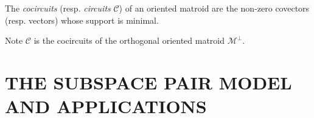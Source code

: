 \documentclass{article}
\def\Reals{\ensuremath{\mathbf R}}
\newtheorem{theorem}{Theorem}
\newcommand{\extra}[1]{}
\begin{document}
The \textit{cocircuits} (resp. \textit{circuits} $\mathcal{C}$)
of an oriented matroid are the non-zero covectors (resp. vectors)
whose support is minimal.  
\extra{Minty's painting property,
most popularly known as a theorem about 
directed graphs\cite{VandewalleChua}, is generally true about
the cocircuit $\mathcal{C}^*(\mathcal{M})$ and circuit 
$\mathcal{C}(\mathcal{M})$ collections.}
Note $\mathcal{C}$ is the
cocircuits of the orthogonal oriented matroid $\mathcal{M}^\perp$.
\extra{In fact, when the 
simple non-triviality, symmetry, and minimal support properties are assumed, 
the painting property characterizes when 
$\mathcal{C}^*$ and $\mathcal{C}$ are the cocircuit/circuit collections of 
an oriented matroid.}

\extra{
\begin{theorem}
(\cite{OMBOOK}, Th. 3.4.4(4P); \cite{BachemKern}, Prop. 5.12) 
For every partition $U=R\cup G \cup B \cup W$ and for every $e\in R\cup G$,
\textbf{either} %
(a) There exists $X\in\mathcal{C}^*$ so $e\in\mbox{Supp}{X}$,
$X_R\geq 0$, $X_G\leq 0$, $X_B$ unrestricted and $X_W=0$ %
\textbf{or}\\
(b) There exists $Y\in\mathcal{C}$ so $e\in\mbox{Supp}{Y}$,
$Y_R\geq 0$, $Y_G\leq 0$, $Y_B = 0$ and $Y_W$ unrestricted %
\textbf{but not both.}
\end{theorem}
}

\section{THE SUBSPACE PAIR MODEL AND APPLICATIONS}

\begin{comment}
A \textit{subspace pair} $(L_V, L_I)$ is a pair of linear subspaces of
$\Reals^U$, where the elements of finite set $U$ index the coordinates.
The scalar product $v\cdot w = \sum_{e\in U}v_e w_e$ is used to define that
$v, w \in \Reals^U$ are \textit{orthogonal} when $v\cdot w = 0$.  An 
\textit{orthogonal subspace pair}  satisfies $v\cdot w = 0$ for
all $v\in L_V$ and $w\in L_I$.  A subspace pair has \textit{full rank} when
$\mathrm{rank}(L_V)+\mathrm{rank}(L_I)= |U|$.  Hence an orthogonal full rank 
subspace pair is a linear subspace paired with its orthogonal complement.
\end{comment}
\end{document}
